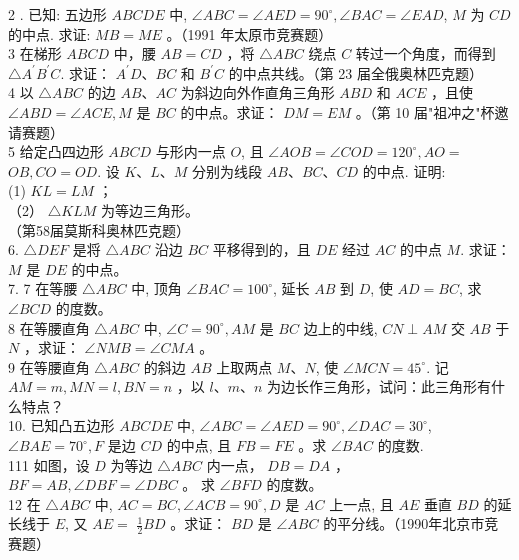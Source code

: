 \documentclass[10pt]{article}
\begin{document}
2 . 已知: 五边形 $A B C D E$ 中, $\angle A B C=\angle A E D=90^{\circ}, \angle B A C=\angle E A D$, $M$ 为 $C D$ 的中点. 求证: $M B=M E$ 。（1991 年太原市竞赛题）\\
3 在梯形 $A B C D$ 中，腰 $A B=C D$ ，将 $\triangle A B C$ 绕点 $C$ 转过一个角度，而得到 $\triangle A^{\prime} B^{\prime} C$. 求证： $A^{\prime} D 、 B C$ 和 $B^{\prime} C$ 的中点共线。（第 23 届全俄奥林匹克题）\\
4 以 $\triangle A B C$ 的边 $A B 、 A C$ 为斜边向外作直角三角形 $A B D$ 和 $A C E$ ，且使 $\angle A B D=\angle A C E, M$ 是 $B C$ 的中点。求证： $D M=E M$ 。（第 10 届"祖冲之"杯邀请赛题）\\
5 给定凸四边形 $A B C D$ 与形内一点 $O$, 且 $\angle A O B=\angle C O D=120^{\circ}, A O=$ $O B, C O=O D$. 设 $K 、 L 、 M$ 分别为线段 $A B 、 B C 、 C D$ 的中点. 证明:\\
(1) $K L=L M$ ；\\
（2） $\triangle K L M$ 为等边三角形。\\
（第58届莫斯科奥林匹克题）\\
6. $\triangle D E F$ 是将 $\triangle A B C$ 沿边 $B C$ 平移得到的，且 $D E$ 经过 $A C$ 的中点 $M$. 求证： $M$ 是 $D E$ 的中点。\\
7. 7 在等腰 $\triangle A B C$ 中, 顶角 $\angle B A C=100^{\circ}$, 延长 $A B$ 到 $D$, 使 $A D=B C$, 求 $\angle B C D$ 的度数。\\
8 在等腰直角 $\triangle A B C$ 中, $\angle C=90^{\circ}, A M$ 是 $B C$ 边上的中线, $C N \perp A M$ 交 $A B$ 于 $N$ ，求证： $\angle N M B=\angle C M A$ 。\\
9 在等腰直角 $\triangle A B C$ 的斜边 $A B$ 上取两点 $M 、 N$, 使 $\angle M C N=45^{\circ}$. 记 $A M=m, M N=l, B N=n$ ，以 $l 、 m 、 n$ 为边长作三角形，试问：此三角形有什么特点？\\
10. 已知凸五边形 $A B C D E$ 中, $\angle A B C=\angle A E D=90^{\circ}, \angle D A C=30^{\circ}$, $\angle B A E=70^{\circ}, F$ 是边 $C D$ 的中点, 且 $F B=F E$ 。求 $\angle B A C$ 的度数.\\
111 如图，设 $D$ 为等边 $\triangle A B C$ 内一点， $D B=D A$ ， $B F=A B, \angle D B F=\angle D B C$ 。 求 $\angle B F D$ 的度数。\\
12 在 $\triangle A B C$ 中, $A C=B C, \angle A C B=90^{\circ}, D$ 是 $A C$ 上一点, 且 $A E$ 垂直 $B D$ 的延长线于 $E$, 又 $A E=$ $\frac{1}{2} B D$ 。求证： $B D$ 是 $\angle A B C$ 的平分线。（1990年北京市竞赛题）\\
\end{document}
